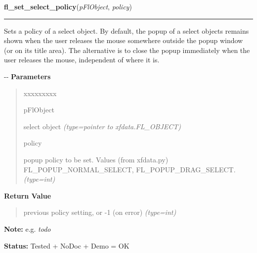     \label{xformslib:flselect:fl_set_select_policy}

    \vspace{0.5ex}

\hspace{.8\funcindent}\begin{boxedminipage}{\funcwidth}

    \raggedright \textbf{fl\_set\_select\_policy}(\textit{pFlObject}, \textit{policy})

    \vspace{-1.5ex}

    \rule{\textwidth}{0.5\fboxrule}
\setlength{\parskip}{2ex}

Sets a policy of a select object. By default, the popup of a select
objects remains shown when the user releases the mouse somewhere outside
the popup window (or on its title area). The alternative is to close the
popup immediately when the user releases the mouse, independent of where
it is.

-{}-
\setlength{\parskip}{1ex}
      \textbf{Parameters}
      \vspace{-1ex}

      \begin{quote}
        \begin{Ventry}{xxxxxxxxx}

          \item[pFlObject]


select object
            {\it (type=pointer to xfdata.FL\_OBJECT)}

          \item[policy]


popup policy to be set. Values (from xfdata.py) FL\_POPUP\_NORMAL\_SELECT,
FL\_POPUP\_DRAG\_SELECT.
            {\it (type=int)}

        \end{Ventry}

      \end{quote}

      \textbf{Return Value}
    \vspace{-1ex}

      \begin{quote}

previous policy setting, or -1 (on error)
      {\it (type=int)}

      \end{quote}

\textbf{Note:} 
e.g. \emph{todo}


\textbf{Status:} 
Tested + NoDoc + Demo = OK


    \end{boxedminipage}

